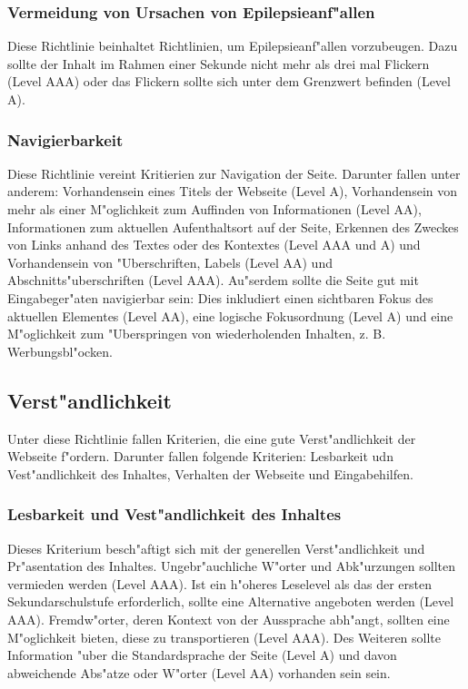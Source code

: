 \documentclass[a4paper,bibtotoc,oneside]{scrbook}
\begin{document}
\subsubsection{Vermeidung von Ursachen von Epilepsieanf"allen}
Diese Richtlinie beinhaltet Richtlinien, um Epilepsieanf"allen vorzubeugen. Dazu sollte der Inhalt im Rahmen einer Sekunde nicht mehr als drei mal Flickern (Level AAA) oder das Flickern sollte sich unter dem Grenzwert befinden (Level A). \cite[Abschnitt 2.3]{wcag2}

\subsubsection{Navigierbarkeit}
Diese Richtlinie vereint Kritierien zur Navigation der Seite. Darunter fallen unter anderem: Vorhandensein eines Titels der Webseite (Level A), Vorhandensein von mehr als einer M"oglichkeit zum Auffinden von Informationen (Level AA), Informationen zum aktuellen Aufenthaltsort auf der Seite, Erkennen des Zweckes von Links anhand des Textes oder des Kontextes (Level AAA und A) und Vorhandensein von "Uberschriften, Labels (Level AA) und Abschnitts"uberschriften (Level AAA). Au"serdem sollte die Seite gut mit Eingabeger"aten navigierbar sein: Dies inkludiert einen sichtbaren Fokus des aktuellen Elementes (Level AA), eine logische Fokusordnung (Level A) und eine M"oglichkeit zum "Uberspringen von wiederholenden Inhalten, z. B. Werbungsbl"ocken. \cite[Abschnitt 2.4]{wcag2}



\subsection{Verst"andlichkeit}
Unter diese Richtlinie fallen Kriterien, die eine gute Verst"andlichkeit der Webseite f"ordern. Darunter fallen folgende Kriterien: Lesbarkeit udn Vest"andlichkeit des Inhaltes, Verhalten der Webseite und Eingabehilfen. \cite[Abschnitt 3]{wcag2}

\subsubsection{Lesbarkeit und Vest"andlichkeit des Inhaltes}
Dieses Kriterium besch"aftigt sich mit der generellen Verst"andlichkeit und Pr"asentation des Inhaltes. Ungebr"auchliche W"orter und Abk"urzungen sollten vermieden werden (Level AAA). Ist ein h"oheres Leselevel als das der ersten Sekundarschulstufe erforderlich, sollte eine Alternative angeboten werden (Level AAA). Fremdw"orter, deren Kontext von der Aussprache abh"angt, sollten eine M"oglichkeit bieten, diese zu transportieren (Level AAA). Des Weiteren sollte Information "uber die Standardsprache der Seite (Level A) und davon abweichende Abs"atze oder W"orter (Level AA) vorhanden sein sein. \cite[Abschnitt 3.1]{wcag2}
\end{document}
